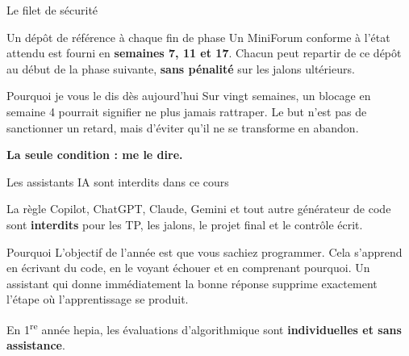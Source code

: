 \documentclass[aspectratio=169,11pt]{beamer}
\begin{document}
\begin{frame}{Le filet de sécurité}
  \begin{block}{Un dépôt de référence à chaque fin de phase}
    Un MiniForum conforme à l'état attendu est fourni en \textbf{semaines 7, 11 et 17}. Chacun peut repartir de ce dépôt au début de la phase suivante, \textbf{sans pénalité} sur les jalons ultérieurs.
  \end{block}
  \vspace{0.4cm}
  \begin{exampleblock}{Pourquoi je vous le dis dès aujourd'hui}
    Sur vingt semaines, un blocage en semaine 4 pourrait signifier ne plus jamais rattraper. Le but n'est pas de sanctionner un retard, mais d'éviter qu'il ne se transforme en abandon.
    \vspace{0.15cm}

    \textbf{La seule condition : me le dire.}
  \end{exampleblock}
\end{frame}

\begin{frame}{Les assistants IA sont interdits dans ce cours}
  \begin{alertblock}{La règle}
    Copilot, ChatGPT, Claude, Gemini et tout autre générateur de code sont \textbf{interdits} pour les TP, les jalons, le projet final et le contrôle écrit.
  \end{alertblock}
  \vspace{0.2cm}
  \begin{block}{Pourquoi}
    L'objectif de l'année est que vous sachiez programmer. Cela s'apprend en écrivant du code, en le voyant échouer et en comprenant pourquoi. Un assistant qui donne immédiatement la bonne réponse supprime exactement l'étape où l'apprentissage se produit.
    \vspace{0.15cm}

    En 1\textsuperscript{re} année hepia, les évaluations d'algorithmique sont \textbf{individuelles et sans assistance}.
  \end{block}
\end{frame}
\end{document}
